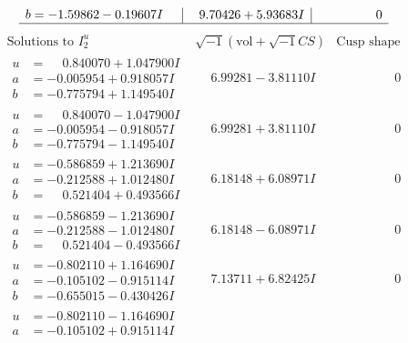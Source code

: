 \documentclass[1p]{elsarticle_modified}
\theoremstyle{definition}
\newcommand{\I}{\sqrt{-1}}
\begin{document}
$$\begin{array}{c|c|c}
\begin{aligned}
b &= -1.59862 - 0.19607 I\end{aligned}
 & \phantom{-}9.70426 + 5.93683 I & \phantom{-0.000000 } 0\\
 \hline 
 \end{array}$$\newpage$$\begin{array}{c|c|c}  
\text{Solutions to }I^u_{2}& \I (\text{vol} + \sqrt{-1}CS) & \text{Cusp shape}\\
 \hline 
\begin{aligned}
u &= \phantom{-}0.840070 + 1.047900 I \\
a &= -0.005954 + 0.918057 I \\
b &= -0.775794 + 1.149540 I\end{aligned}
 & \phantom{-}6.99281 - 3.81110 I & \phantom{-0.000000 } 0 \\ \hline\begin{aligned}
u &= \phantom{-}0.840070 - 1.047900 I \\
a &= -0.005954 - 0.918057 I \\
b &= -0.775794 - 1.149540 I\end{aligned}
 & \phantom{-}6.99281 + 3.81110 I & \phantom{-0.000000 } 0 \\ \hline\begin{aligned}
u &= -0.586859 + 1.213690 I \\
a &= -0.212588 + 1.012480 I \\
b &= \phantom{-}0.521404 + 0.493566 I\end{aligned}
 & \phantom{-}6.18148 + 6.08971 I & \phantom{-0.000000 } 0 \\ \hline\begin{aligned}
u &= -0.586859 - 1.213690 I \\
a &= -0.212588 - 1.012480 I \\
b &= \phantom{-}0.521404 - 0.493566 I\end{aligned}
 & \phantom{-}6.18148 - 6.08971 I & \phantom{-0.000000 } 0 \\ \hline\begin{aligned}
u &= -0.802110 + 1.164690 I \\
a &= -0.105102 - 0.915114 I \\
b &= -0.655015 - 0.430426 I\end{aligned}
 & \phantom{-}7.13711 + 6.82425 I & \phantom{-0.000000 } 0 \\ \hline\begin{aligned}
u &= -0.802110 - 1.164690 I \\
a &= -0.105102 + 0.915114 I \\

\end{aligned}
\end{array}$$
\end{document}
